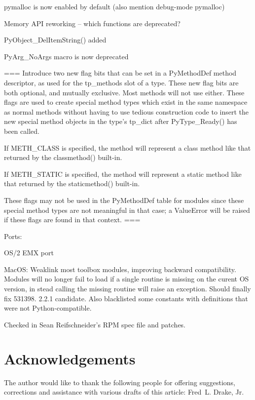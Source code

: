\documentclass{howto}
\begin{document}
pymalloc is now enabled by default (also mention debug-mode pymalloc)

Memory API reworking -- which functions are deprecated?  

PyObject_DelItemString() added

PyArg_NoArgs macro is now deprecated

===
Introduce two new flag bits that can be set in a PyMethodDef method
descriptor, as used for the tp_methods slot of a type.  These new flag
bits are both optional, and mutually exclusive.  Most methods will not
use either.  These flags are used to create special method types which
exist in the same namespace as normal methods without having to use
tedious construction code to insert the new special method objects in
the type's tp_dict after PyType_Ready() has been called.

If METH_CLASS is specified, the method will represent a class method
like that returned by the classmethod() built-in.

If METH_STATIC is specified, the method will represent a static method
like that returned by the staticmethod() built-in.

These flags may not be used in the PyMethodDef table for modules since
these special method types are not meaningful in that case; a
ValueError will be raised if these flags are found in that context.
===

Ports:

OS/2 EMX port

MacOS: Weaklink most toolbox modules, improving backward
compatibility. Modules will no longer fail to load if a single routine
is missing on the curent OS version, in stead calling the missing
routine will raise an exception.  Should finally fix 531398. 2.2.1
candidate.  Also blacklisted some constants with definitions that
were not Python-compatible.

Checked in Sean Reifschneider's RPM spec file and patches.


\section{Acknowledgements \label{acks}}

The author would like to thank the following people for offering
suggestions, corrections and assistance with various drafts of this
article: Fred~L. Drake, Jr.
\end{document}
